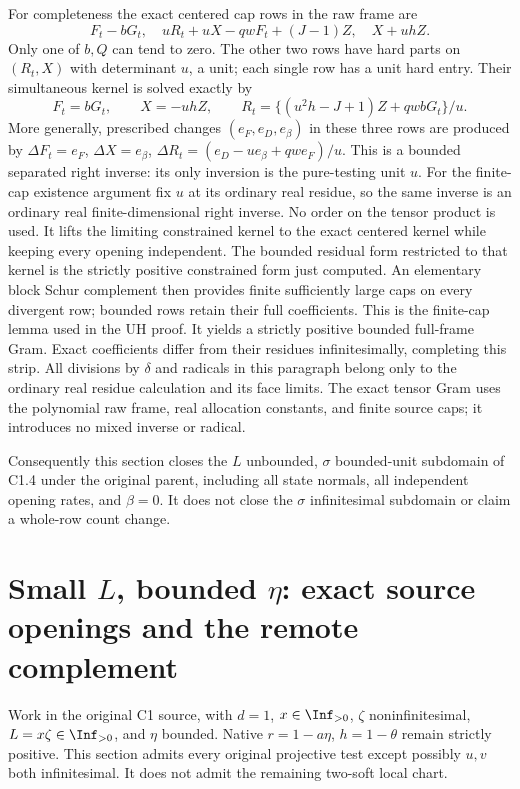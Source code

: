 For completeness the exact centered cap rows in the raw frame are
\[
 F_t-bG_t,\quad
 uR_t+uX-qwF_t+(J-1)Z,\quad X+uhZ.
\]
Only one of $b,Q$ can tend to zero. The other two rows have hard parts
on $(R_t,X)$ with determinant $u$, a unit; each single row has a unit
hard entry. Their simultaneous kernel is solved exactly by
\[
F_t=bG_t,\qquad X=-uhZ,\qquad
R_t=\{(u^2h-J+1)Z+qwbG_t\}/u.
\]
More generally, prescribed changes $(e_F,e_D,e_\beta)$ in these three
rows are produced by
$\Delta F_t=e_F$, $\Delta X=e_\beta$,
$\Delta R_t=(e_D-u e_\beta+qw e_F)/u$.
This is a bounded separated right inverse: its only inversion is the
pure-testing unit $u$. For the finite-cap existence argument fix $u$
at its ordinary real residue, so the same inverse is an ordinary real
finite-dimensional right inverse. No order on the tensor product is
used. It lifts the limiting constrained kernel to the exact centered
kernel while keeping every opening independent. The
bounded residual form restricted to that kernel is the strictly positive
constrained form just computed. An elementary block Schur complement
then provides finite sufficiently large caps on every divergent row;
bounded rows retain their full coefficients. This is the finite-cap
lemma used in the UH proof. It yields a strictly positive bounded
full-frame Gram. Exact coefficients differ from their residues
infinitesimally, completing this strip.
All divisions by $\delta$ and radicals in this paragraph belong only
to the ordinary real residue calculation and its face limits. The exact
tensor Gram uses the polynomial raw frame, real allocation constants,
and finite source caps; it introduces no mixed inverse or radical.

Consequently this section closes the $L$ unbounded, $\sigma$ bounded-unit
subdomain of C1.4 under the original parent, including all state normals,
all independent opening rates, and $\beta=0$. It does not close the
$\sigma$ infinitesimal subdomain or claim a whole-row count change.


\section{\texorpdfstring{Small $L$, bounded $\eta$: exact source openings and the remote complement}{Small L, bounded eta: exact source openings and the remote complement}}
\label{component:p6d2f659c0fde}

\label{p6d2f659c0fde:sec:r8-c1-small-L-bounded-eta}

Work in the original C1 source, with $d=1$, $x\in\Inf_{>0}$,
$\zeta$ noninfinitesimal, $L=x\zeta\in\Inf_{>0}$, and $\eta$
bounded. Native $r=1-a\eta$, $h=1-\theta$ remain strictly positive.
This section admits every original projective test except possibly
$u,v$ both infinitesimal. It does not admit the remaining two-soft
local chart.


